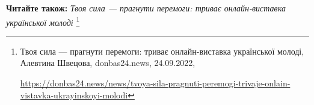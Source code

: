  
 
 
 
 

\textbf{Читайте також:} \emph{Твоя сила — прагнути перемоги: триває онлайн-виставка української молоді}%
\footnote{Твоя сила — прагнути перемоги: триває онлайн-виставка української молоді, Алевтина Швецова, donbas24.news, 24.09.2022, \par%
\url{https://donbas24.news/news/tvoya-sila-pragnuti-peremogi-trivaje-onlain-vistavka-ukrayinskoyi-molodi}%
}
